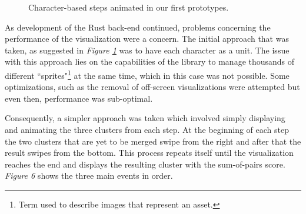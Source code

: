 \documentclass[twoside,openright,titlepage,numbers=noenddot,headinclude,%
                footinclude=true,cleardoublepage=empty,abstractoff, %
                BCOR=5mm,paper=a4,fontsize=11pt,%
                ngerman,american,%
                ]{scrreprt}
\begin{document}
\begin{figure}%
    \centering
    \qquad
    \qquad
    \caption{Character-based steps animated in our first prototypes.}
    \label{fig:proto}
\end{figure}

As development of the Rust back-end continued, problems concerning the performance of the visualization were a concern. The initial approach that was taken, as suggested in \textit{Figure \ref{fig:proto}} was to have each character as a unit. The issue with this approach lies on the capabilities of the library to manage thousands of different ``sprites"\footnote{Term used to describe images that represent an asset.} at the same time, which in this case was not possible. Some optimizations, such as the removal of off-screen visualizations were attempted but even then, performance was sub-optimal.

Consequently, a simpler approach was taken which involved simply displaying and animating the three clusters from each step. At the beginning of each step the two clusters that are yet to be merged swipe from the right and after that the result swipes from the bottom. This process repeats itself until the visualization reaches the end and displays the resulting cluster with the sum-of-pairs score. \textit{Figure 6} shows the three main events in order.
\end{document}
